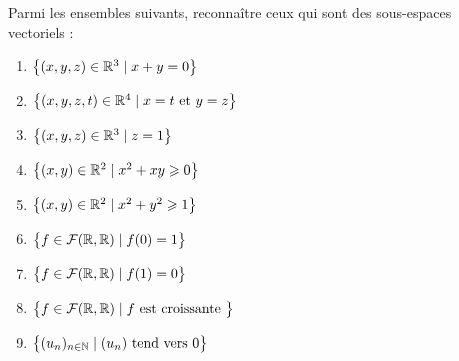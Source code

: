 \begin{frame}

\begin{miniexercice}
Parmi les ensembles suivants, reconnaître ceux qui sont des sous-espaces
vectoriels :
  \begin{enumerate}
    \item $\big\{(x,y,z)\in \mathbb{R}^3 \mid  x+y=0\big\}$
    \item $\big\{(x,y,z,t)\in \mathbb{R}^4 \mid  x=t \text{ et } y=z\big\}$
    \item $\big\{(x,y,z)\in \mathbb{R}^3 \mid z=1\big\}$
    \item $\big\{(x,y)\in \mathbb{R}^2 \mid x^2+xy\geqslant 0\big\}$
    \item $\big\{(x,y)\in \mathbb{R}^2 \mid x^2+y^2 \geqslant 1\big\}$
    \item $\big\{f \in \mathcal{F}(\mathbb{R},\mathbb{R}) \mid f(0)=1\big\}$
    \item $\big\{f \in \mathcal{F}(\mathbb{R},\mathbb{R}) \mid f(1)=0\big\}$
    \item $\big\{f \in \mathcal{F}(\mathbb{R},\mathbb{R}) \mid f \text{ est croissante }\big\}$  
    \item $\big\{ (u_n)_{n\in\mathbb{N}} \mid (u_n) \text{ tend vers } 0 \big\}$  
  \end{enumerate}

\end{miniexercice}

\end{frame}

